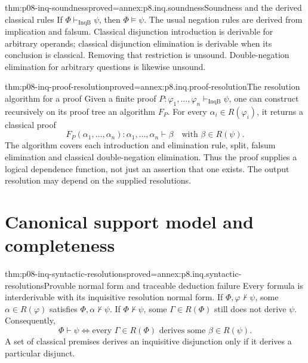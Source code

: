 
\begin{hbtheorem}{thm:p08-inq-soundness}{proved=annex:p8.inq.soundness}{Soundness and the derived classical rules}
If \(\Phi\vdash_{\mathrm{InqB}}\psi\), then \(\Phi\models\psi\).
The usual negation rules are derived from implication and falsum.
Classical disjunction introduction is derivable for arbitrary operands;
classical disjunction elimination is derivable when its conclusion is
classical. Removing that restriction is unsound. Double-negation elimination
for arbitrary questions is likewise unsound.
\end{hbtheorem}

\begin{hbtheorem}{thm:p08-inq-proof-resolution}{proved=annex:p8.inq.proof-resolution}{The resolution algorithm for a proof}
Given a finite proof \(P:\varphi_1,\ldots,\varphi_n\vdash_{\mathrm{InqB}}\psi\),
one can construct recursively on its proof tree an algorithm \(F_P\).
For every \(\alpha_i\in R(\varphi_i)\), it returns a classical proof
\[
 F_P(\alpha_1,\ldots,\alpha_n):
 \alpha_1,\ldots,\alpha_n\vdash\beta
 \quad\text{with }\beta\in R(\psi).
\]
The algorithm covers each introduction and elimination rule, split,
falsum elimination and classical double-negation elimination. Thus the
proof supplies a logical dependence function, not just an assertion that
one exists. The output resolution may depend on the supplied resolutions.
\end{hbtheorem}

\section{Canonical support model and completeness}

\begin{hblemma}{thm:p08-inq-syntactic-resolutions}{proved=annex:p8.inq.syntactic-resolutions}{Provable normal form and traceable deduction failure}
Every formula is interderivable with its inquisitive resolution normal form.
If \(\Phi,\varphi\not\vdash\psi\), some \(\alpha\in R(\varphi)\)
satisfies \(\Phi,\alpha\not\vdash\psi\). If \(\Phi\not\vdash\psi\),
some \(\Gamma\in R(\Phi)\) still does not derive \(\psi\). Consequently,
\[
 \Phi\vdash\psi
 \Longleftrightarrow
 \text{every }\Gamma\in R(\Phi)\text{ derives some }\beta\in R(\psi).
\]
A set of classical premises derives an inquisitive disjunction only if it
derives a particular disjunct.
\end{hblemma}

